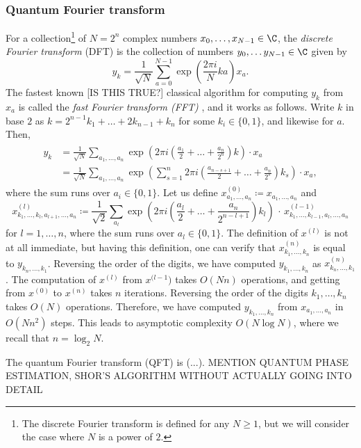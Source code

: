 \subsubsection{Quantum Fourier transform} \label{sec:quantum_computation_example}
For a collection\footnote{The discrete Fourier transform is defined for any $N \ge 1$, but we will consider the case where $N$ is a power of $2$.} of $N = 2^n$ complex numbers $x_0, \dots, x_{N-1} \in \C$, the \emph{discrete Fourier transform} (DFT) is the collection of numbers $y_0, \dots y_{N-1} \in \C$ given by
\begin{equation}
    y_k = \frac{1}{\sqrt{N}} \sum_{a=0}^{N-1}{\exp\left(\frac{2 \pi i}{N} k a\right) x_a}.
\end{equation}
The fastest known [IS THIS TRUE?] classical algorithm for computing $y_k$ from $x_a$ is called the \emph{fast Fourier transform (FFT)}  \cite{Weisstein_FFT}, and it works as follows. Write $k$ in base $2$ as $k = 2^{n-1} k_1 + \dots + 2 k_{n-1} + k_n$ for some $k_i \in \{0, 1\}$, and likewise for $a$. Then,
\begin{align*} \begin{split}
    y_k &= \frac{1}{\sqrt{N}} \sum_{a_1, \dots, a_n}{\exp\left(2 \pi i \left(\frac{a_1}{2} + \dots + \frac{a_n}{2^n}\right) k\right) \cdot x_a}\\
    &= \frac{1}{\sqrt{N}} \sum_{a_1, \dots, a_n} \exp\left(\sum_{s=1}^{n}{2 \pi i \left(\frac{a_{n-s+1}}{2} + \dots + \frac{a_n}{2^s}\right) k_s}\right) \cdot x_a,
\end{split} \end{align*}
where the sum runs over $a_i \in \{0, 1\}$. Let us define $x^{(0)}_{a_1, \dots, a_n} \coloneqq x_{a_1, \dots, a_n}$ and
\begin{equation}
    x^{(l)}_{k_1, \dots, k_l, a_{l+1}, \dots, a_n} \coloneqq \frac{1}{\sqrt{2}} \sum_{a_l}{\exp\left(2 \pi i \left(\frac{a_l}{2} + \dots + \frac{a_n}{2^{n-l+1}}\right) k_l\right)} \, \cdot \, x^{(l-1)}_{k_1, \dots, k_{l-1}, a_l, \dots, a_n}
\end{equation}
for $l = 1, \dots, n$, where the sum runs over $a_l \in \{0, 1\}$. The definition of $x^{(l)}$ is not at all immediate, but having this definition, one can verify that $x^{(n)}_{k_1, \dots, k_n}$ is equal to $y_{k_n, \dots, k_1}$. Reversing the order of the digits, we have computed $y_{k_1, \dots, k_n}$ as $x^{(n)}_{k_n, \dots, k_1}$. The computation of $x^{(l)}$ from $x^{(l-1})$ takes $O(N n)$ operations, and getting from $x^{(0)}$ to $x^{(n)}$ takes $n$ iterations. Reversing the order of the digits $k_1, \dots, k_n$ takes $O(N)$ operations. Therefore, we have computed $y_{k_1, \dots, k_n}$ from $x_{a_1, \dots, a_n}$ in $O(N n^2)$ steps. This leads to asymptotic complexity $O(N \log N)$, where we recall that $n = \log_2 N$.

The quantum Fourier transform (QFT) \cite{Nielsen_Chuang_2010} is (...). MENTION QUANTUM PHASE ESTIMATION, SHOR'S ALGORITHM WITHOUT ACTUALLY GOING INTO DETAIL

